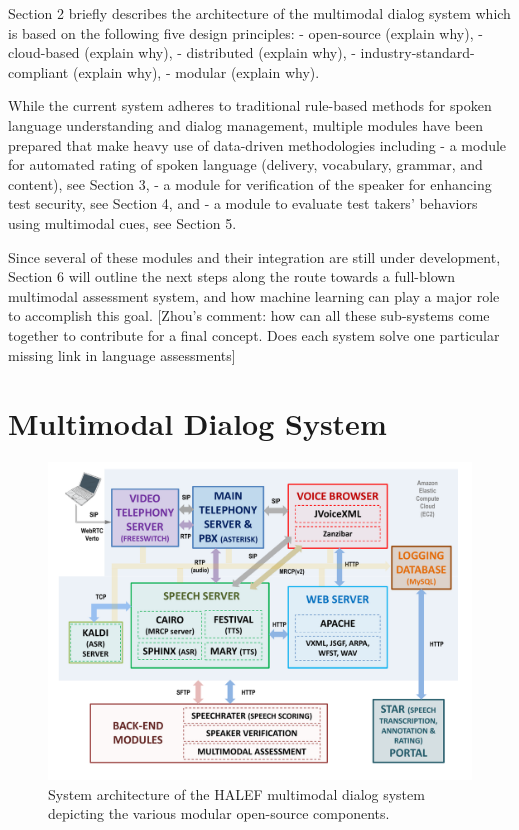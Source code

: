 \documentclass{article} %
\begin{document}
Section 2 briefly describes the architecture of the multimodal dialog
system which is based on the following five design principles:
- open-source (explain why), 
- cloud-based (explain why),
- distributed (explain why),
- industry-standard-compliant (explain why),
- modular (explain why).

While the current system adheres to traditional rule-based methods for
spoken language understanding and dialog management, multiple modules
have been prepared that make heavy use of data-driven methodologies
including
- a module for automated rating of spoken language (delivery,
vocabulary, grammar, and content), see Section 3,
- a module for verification of the speaker for enhancing test security,
see Section 4, and
- a module to evaluate test takers' behaviors using multimodal cues, see
Section 5.

Since several of these modules and their integration are still under
development, Section 6 will outline the next steps along the route
towards a full-blown multimodal assessment system, and how machine
learning can play a major role to accomplish this goal.
[Zhou's comment: how can all these sub-systems come together to contribute for a final concept. Does each system solve one particular missing link in language assessments]

\section{Multimodal Dialog System}

\begin{figure}[htb]
\centering
\includegraphics[scale=.50]{HALEF_v3_video_diffModules}
\vspace{-5mm}
\caption{System architecture of the HALEF multimodal dialog system depicting the various modular open-source components.}
\label{fig:HALEF}       
\vspace{-5mm}
\end{figure}
\end{document}
